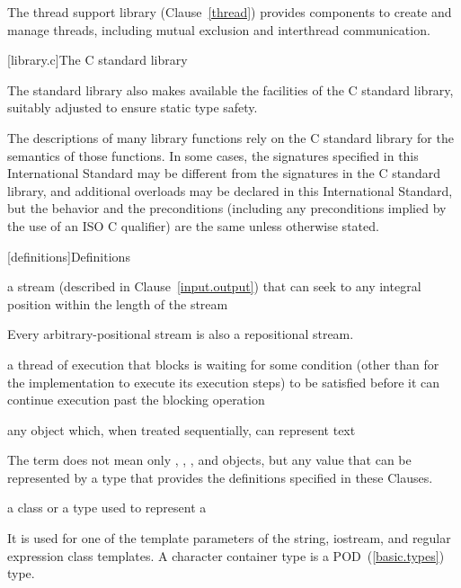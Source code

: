 \pnum
The thread support library (Clause~\ref{thread}) provides components to create
and manage threads, including mutual exclusion and interthread communication.

[library.c]{The C standard library}

\pnum
The \Cpp standard library also makes available the facilities of the C standard library,
%
suitably adjusted to ensure static type safety.

\pnum
The descriptions of many library functions rely on the C standard library for
the semantics of those functions.
In some cases,
the signatures specified in this International Standard
may be different from the signatures in the C standard library,
and additional overloads may be declared in this International Standard,
but the behavior and the preconditions
(including any preconditions implied by the use of an
ISO C  qualifier)
are the same unless otherwise stated.

[definitions]{Definitions}

%
a stream (described in Clause~\ref{input.output}) that can seek to any integral position within
the length of the stream\\
\begin{note} Every arbitrary-positional stream is also a repositional stream. \end{note}

%
a thread of execution that blocks is waiting for some condition (other than
for the implementation to execute its execution steps) to be satisfied before
it can continue execution past the blocking operation

%
any object which,
when treated sequentially,
can represent text\\
\begin{note}
The term does not mean only
,
,
,
and
objects,
but any value that can be represented by a type
that provides the definitions specified in these Clauses.
\end{note}

%
a class or a type used to
represent a
\\
\begin{note}
It is used for one of the template parameters of the string,
iostream, and regular expression class templates.
A character container type is a POD~(\ref{basic.types}) type.
\end{note}


